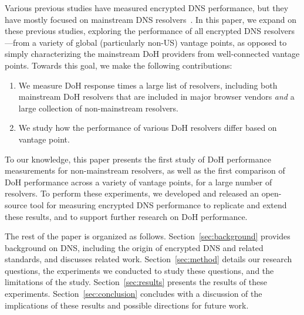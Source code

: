 Various previous studies have measured encrypted DNS performance, but they have mostly focused on mainstream DNS resolvers~\cite{borgolte2019dns,hounsel2020comparing,KResolver,lu2019end-to-end}.
In this paper, we expand on these previous studies, exploring the performance
of all encrypted DNS resolvers---from a variety of global (particularly
non-US) vantage points, as opposed to simply characterizing the mainstream DoH
providers from well-connected vantage points.
Towards this goal, we make the following contributions:
\begin{enumerate}
    \itemsep=-1pt
    \item We measure DoH response times a large list of resolvers, including
        both mainstream DoH resolvers that are included in major browser
        vendors {\em and} a large collection of non-mainstream resolvers.
    \item We study how the performance of various DoH resolvers differ based
        on vantage point.
\end{enumerate}
\noindent
To our knowledge, this paper presents the first study of DoH performance
measurements for non-mainstream resolvers, as well as the first comparison of
DoH performance across a variety of vantage points, for a large number of
resolvers.
To perform these experiments, we developed and released an open-source
tool for measuring encrypted DNS performance to replicate and extend these
results, and to support further research on DoH performance.

The rest of the paper is organized as follows.  Section~\ref{sec:background}
provides background on DNS, including the origin of encrypted DNS and related
standards, and discusses related work.  Section~\ref{sec:method} details our research questions, the
experiments we conducted to study these questions, and the limitations of the
study.  Section~\ref{sec:results} presents the results of these experiments.
Section~\ref{sec:conclusion} concludes with a discussion of the implications
of these results and possible directions for future work. 

